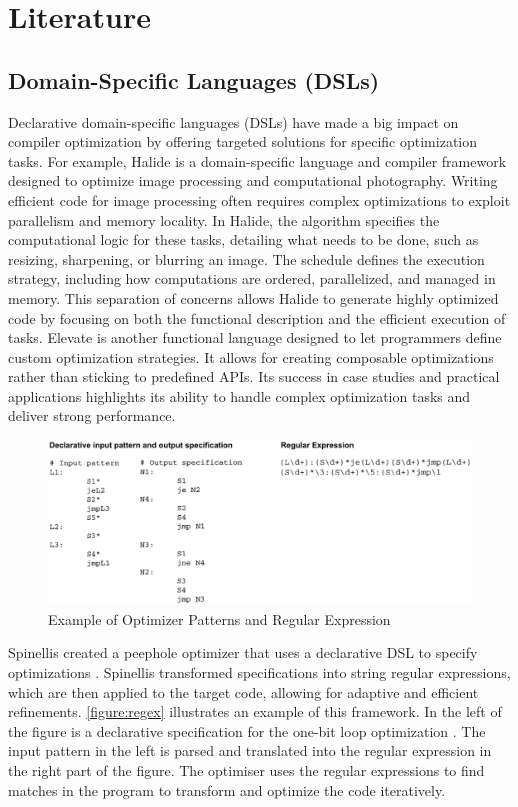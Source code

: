 \chapter[Literature Review]{Literature}

\section{Domain-Specific Languages (DSLs)}
Declarative domain-specific languages (DSLs) have made a big impact on compiler optimization by offering targeted solutions for specific optimization tasks. For example, Halide \cite{Jonathan2018} is a domain-specific language and compiler framework designed to optimize image processing and computational photography. Writing efficient code for image processing often requires complex optimizations to exploit parallelism and memory locality. In Halide, the algorithm specifies the computational logic for these tasks, detailing what needs to be done, such as resizing, sharpening, or blurring an image. The schedule defines the execution strategy, including how computations are ordered, parallelized, and managed in memory. This separation of concerns allows Halide to generate highly optimized code by focusing on both the functional description and the efficient execution of tasks. Elevate \cite{Hagedorn2020} is another functional language designed to let programmers define custom optimization strategies. It allows for creating composable optimizations rather than sticking to predefined APIs. Its success in case studies and practical applications highlights its ability to handle complex optimization tasks and deliver strong performance.

\begin{figure}[h]
    \centering
    \includegraphics[width=1\textwidth]{Packages/regex.png}
    \caption{Example of Optimizer Patterns and Regular Expression \cite{Spinellis1999}}
    \label{figure:regex}
\end{figure}

Spinellis created a peephole optimizer that uses a declarative DSL to specify optimizations \cite{Spinellis1999}. Spinellis transformed specifications into string regular expressions, which are then applied to the target code, allowing for adaptive and efficient refinements. \autoref{figure:regex} illustrates an example of this framework. In the left of the figure is a declarative specification for the one-bit loop optimization \cite{Spinellis1999}. The input pattern in the left is parsed and translated into the regular expression in the right part of the figure. The optimiser uses the regular expressions to find matches in the program to transform and optimize the code iteratively. 

